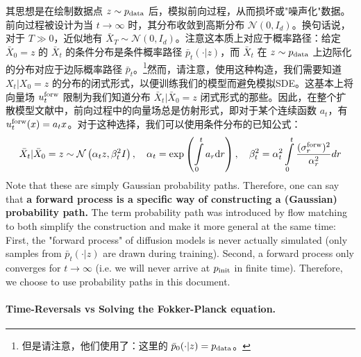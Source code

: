 其思想是在绘制数据点 $z\sim p_{\rm{data}}$ 后，模拟前向过程，从而损坏或"噪声化"数据。前向过程被设计为当 $t\to \infty$ 时，其分布收敛到高斯分布 $\mathcal{N}(0,I_d)$。换句话说，对于 $T\gg 0$，近似地有 $\bar{X}_{T}\sim\mathcal{N}(0,I_d)$。注意这本质上对应于概率路径：给定 $\bar{X}_0=z$ 的 $\bar{X}_t$ 的条件分布是条件概率路径 $\bar{p}_t(\cdot|z)$，而 $\bar{X}_t$ 在 $z\sim p_{\rm{data}}$ 上边际化的分布对应于边际概率路径 $\bar{p}_t$。\footnote{但是请注意，他们使用了：这里的 $\bar{p}_0(\cdot|z)=p_{\rm{data}}$。}然而，请注意，使用这种构造，我们需要知道 $X_t|X_0=z$ 的分布的闭式形式，以便训练我们的模型而避免模拟SDE。这基本上将向量场 $u^{\text{forw}}_t$ 限制为我们知道分布 $\bar{X}_t|\bar{X}_0=z$ 闭式形式的那些。因此，在整个扩散模型文献中，前向过程中的向量场总是仿射形式，即对于某个连续函数 $a_t$，有 $u^{\text{forw}}_t(x)=a_t x$。对于这种选择，我们可以使用条件分布的已知公式\citep{sarkka2019applied,song2021sde, karras2022elucidating}：
\begin{align*}
\bar{X}_t|\bar{X}_0=z\sim\mathcal{N}\left(\alpha_t z,\beta_t^2 I\right),\quad\alpha_t=\exp\left (\int\limits_{0}^{t}a_r\mathrm{d} r\right ),\quad\beta_t^2=\alpha_t^2\int\limits_{0}^{t}\frac{(\sigma^{\text{forw}}_r)^2}{\alpha^2_r}dr
\end{align*}
Note that these are simply Gaussian probability paths. Therefore, one can say that \textbf{a forward process is a specific way of constructing a (Gaussian) probability path.} The term probability path was introduced by flow matching \citep{lipman2022flow} to both simplify the construction and make it more general at the same time: First, the "forward process" of diffusion models is never actually simulated (only samples from $\bar{p}_t(\cdot|z)$ are drawn during training). Second, a forward process only converges for $t\to\infty$ (i.e. we will never arrive at $p_{\rm{init}}$ in finite time). Therefore, we choose to use probability paths in this document.

\paragraph{Time-Reversals vs Solving the Fokker-Planck equation.}

